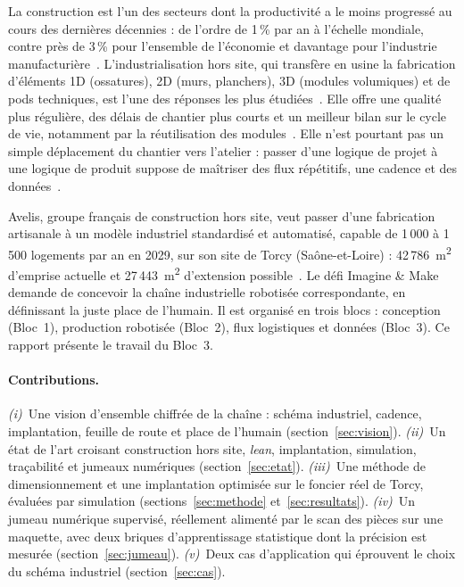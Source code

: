\documentclass[11pt,a4paper]{article}
\newcommand{\mdeux}{m\textsuperscript{2}}
\begin{document}
La construction est l'un des secteurs dont la productivité a le moins progressé au cours des
dernières décennies : de l'ordre de 1\,\% par an à l'échelle mondiale, contre près de 3\,\% pour
l'ensemble de l'économie et davantage pour l'industrie manufacturière~\cite{barbosa2017}.
L'industrialisation hors site, qui transfère en usine la fabrication d'éléments 1D (ossatures),
2D (murs, planchers), 3D (modules volumiques) et de pods techniques, est l'une des réponses les plus
étudiées~\cite{gibb1999,lawson2014,bertram2019}. Elle offre une qualité plus régulière, des délais
de chantier plus courts et un meilleur bilan sur le cycle de vie, notamment par la réutilisation
des modules~\cite{kamali2016}. Elle n'est pourtant pas un simple déplacement du chantier vers
l'atelier : passer d'une logique de projet à une logique de produit suppose de maîtriser des
flux répétitifs, une cadence et des données~\cite{bertram2019}.

Avelis, groupe français de construction hors site, veut passer d'une fabrication artisanale à un
modèle industriel standardisé et automatisé, capable de 1\,000 à 1\,500 logements par an en 2029,
sur son site de Torcy (Saône-et-Loire) : 42\,786~\mdeux{} d'emprise actuelle et 27\,443~\mdeux{}
d'extension possible~\cite{imaginemake2026}. Le défi Imagine \& Make demande de concevoir la chaîne
industrielle robotisée correspondante, en définissant la juste place de l'humain. Il est
organisé en trois blocs : conception (Bloc~1), production robotisée (Bloc~2), flux logistiques
et données (Bloc~3). Ce rapport présente le travail du Bloc~3.

\paragraph{Contributions.} \emph{(i)}~Une vision d'ensemble chiffrée de la chaîne : schéma
industriel, cadence, implantation, feuille de route et place de l'humain (section~\ref{sec:vision}).
\emph{(ii)}~Un état de l'art croisant construction hors site, \emph{lean}, implantation, simulation,
traçabilité et jumeaux numériques (section~\ref{sec:etat}). \emph{(iii)}~Une méthode de
dimensionnement et une implantation optimisée sur le foncier réel de Torcy, évaluées par simulation
(sections~\ref{sec:methode} et~\ref{sec:resultats}). \emph{(iv)}~Un jumeau numérique supervisé,
réellement alimenté par le scan des pièces sur une maquette, avec deux briques d'apprentissage
statistique dont la précision est mesurée (section~\ref{sec:jumeau}). \emph{(v)}~Deux cas
d'application qui éprouvent le choix du schéma industriel (section~\ref{sec:cas}).
\end{document}
